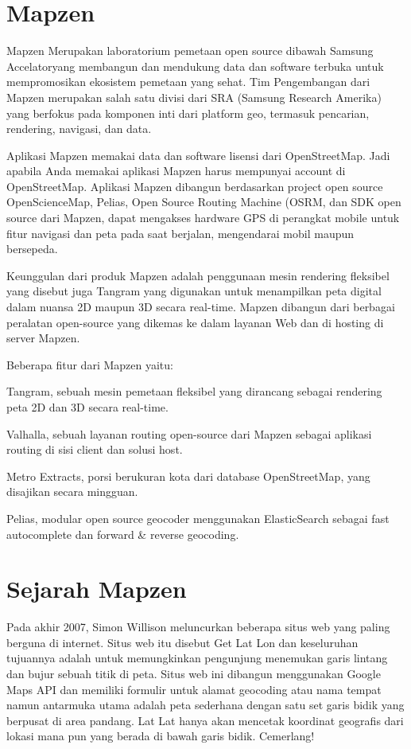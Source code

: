 \section{Mapzen}
Mapzen Merupakan laboratorium pemetaan open source dibawah Samsung Accelatoryang membangun dan mendukung data dan software terbuka untuk mempromosikan ekosistem pemetaan yang sehat. Tim Pengembangan dari Mapzen merupakan salah satu divisi dari SRA (Samsung Research Amerika) yang berfokus pada komponen inti dari platform geo, termasuk pencarian, rendering, navigasi, dan data.

Aplikasi Mapzen memakai data dan software lisensi dari OpenStreetMap. Jadi apabila Anda memakai aplikasi Mapzen harus mempunyai account di OpenStreetMap. Aplikasi Mapzen dibangun berdasarkan project open source OpenScienceMap, Pelias, Open Source Routing Machine (OSRM, dan SDK open source dari Mapzen, dapat mengakses hardware GPS di perangkat mobile untuk fitur navigasi dan peta pada saat berjalan, mengendarai mobil maupun bersepeda.

Keunggulan dari produk Mapzen adalah penggunaan mesin rendering fleksibel yang disebut juga Tangram yang digunakan untuk menampilkan peta digital dalam nuansa 2D maupun 3D secara real-time. Mapzen dibangun dari berbagai peralatan open-source yang dikemas ke dalam layanan Web dan di hosting di server Mapzen.

Beberapa fitur  dari Mapzen yaitu:
\item Tangram, sebuah mesin pemetaan fleksibel yang dirancang sebagai rendering peta 2D dan 3D secara real-time.
\item Valhalla, sebuah layanan routing open-source dari Mapzen sebagai aplikasi routing di sisi client dan solusi host.
\item Metro Extracts, porsi berukuran kota dari database OpenStreetMap, yang disajikan secara mingguan.
\item Pelias, modular open source geocoder menggunakan ElasticSearch sebagai fast autocomplete dan forward & reverse geocoding.

\section{Sejarah Mapzen}
Pada akhir 2007, Simon Willison meluncurkan beberapa situs web yang paling berguna di internet. Situs web itu disebut Get Lat Lon dan keseluruhan tujuannya adalah untuk memungkinkan pengunjung menemukan garis lintang dan bujur sebuah titik di peta.
Situs web ini dibangun menggunakan Google Maps API dan memiliki formulir untuk alamat geocoding atau nama tempat namun antarmuka utama adalah peta sederhana dengan satu set garis bidik yang berpusat di area pandang. Lat Lat hanya akan mencetak koordinat geografis dari lokasi mana pun yang berada di bawah garis bidik. Cemerlang!

